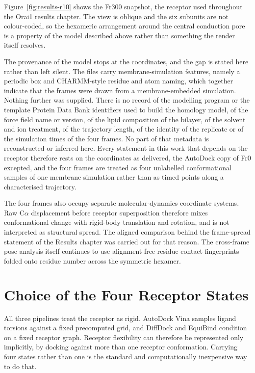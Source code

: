 Figure~\ref{fig:results-r10} shows the Fr300 snapshot, the receptor used throughout the Orai1 results chapter. The view is oblique and the six subunits are not colour-coded, so the hexameric arrangement around the central conduction pore is a property of the model described above rather than something the render itself resolves.

The provenance of the model stops at the coordinates, and the gap is stated here rather than left silent. The files carry membrane-simulation features, namely a periodic box and CHARMM-style residue and atom naming, which together indicate that the frames were drawn from a membrane-embedded simulation. Nothing further was supplied. There is no record of the modelling program or the template Protein Data Bank identifiers used to build the homology model, of the force field name or version, of the lipid composition of the bilayer, of the solvent and ion treatment, of the trajectory length, of the identity of the replicate or of the simulation times of the four frames. No part of that metadata is reconstructed or inferred here. Every statement in this work that depends on the receptor therefore rests on the coordinates as delivered, the AutoDock copy of Fr0 excepted, and the four frames are treated as four unlabelled conformational samples of one membrane simulation rather than as timed points along a characterised trajectory.

The four frames also occupy separate molecular-dynamics coordinate systems. Raw C\ensuremath{\alpha} displacement before receptor superposition therefore mixes conformational change with rigid-body translation and rotation, and is not interpreted as structural spread. The aligned comparison behind the frame-spread statement of the Results chapter was carried out for that reason. The cross-frame pose analysis itself continues to use alignment-free residue-contact fingerprints folded onto residue number across the symmetric hexamer.

\hypertarget{choice-of-the-four-receptor-states}{%
\section{Choice of the Four Receptor States}\label{choice-of-the-four-receptor-states}}

All three pipelines treat the receptor as rigid. AutoDock Vina samples ligand torsions against a fixed precomputed grid, and DiffDock and EquiBind condition on a fixed receptor graph. Receptor flexibility can therefore be represented only implicitly, by docking against more than one receptor conformation. Carrying four states rather than one is the standard and computationally inexpensive way to do that.

